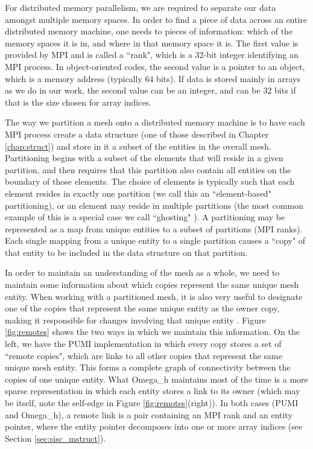 For distributed memory parallelism, we are required to separate our
data amongst multiple memory spaces.
In order to find a piece of data across an entire distributed memory
machine, one needs to pieces of information: which of the
memory spaces it is in, and where in that memory space it is.
The first value is provided by MPI and is called a ``rank", which is
a 32-bit integer identifying an MPI process.
In object-oriented codes, the second value is a pointer
to an object, which is a memory address (typically 64 bits).
If data is stored mainly in arrays as we do in our work,
the second value can be an integer, and can be 32 bits if
that is the size chosen for array indices.

The way we partition a mesh onto a distributed memory machine is
to have each MPI process create a data structure (one of those
described in Chapter \ref{chap:struct}) and store in it a subset
of the entities in the overall mesh.
Partitioning begins with a subset of the elements that will
reside in a given partition, and then requires that this
partition also contain all entities on the boundary of those
elements.
The choice of elements is typically such that each element resides
in exactly one partition (we call this an ``element-based" partitioning),
or an element may reside in multiple partitions (the most common
example of this is a special case we call ``ghosting"
\cite{ibanez2016pumi,lawlor2006parallel}).
A partitioning may be represented as a map from unique entities
to a subset of partitions (MPI ranks).
Each single mapping from a unique entity to a single partition
causes a ``copy" of that entity to be included in the data structure
on that partition.

In order to maintain an understanding of the mesh as a whole,
we need to maintain some information about which copies represent
the same unique mesh entity.
When working with a partitioned mesh, it is also very useful to
designate one of the copies that represent the same unique entity
as the owner copy, making it responsible for changes involving
that unique entity
\cite{seol2005fmdb,seol2006efficient,ibanez2016pumi}.
Figure \ref{fig:remotes} shows the two ways in which we maintain
this information.
On the left, we have the PUMI implementation in which every copy
stores a set of ``remote copies", which are links to all other copies
that represent the same unique mesh entity.
This forms a complete graph of connectivity between the copies of
one unique entity.
What Omega\_h maintains most of the time is a more sparse representation
in which each entity stores a link to its owner (which may
be itself, note the self-edge in Figure \ref{fig:remotes}(right)).
In both cases (PUMI and Omega\_h), a remote link is a pair
containing an MPI rank and an entity pointer, where the
entity pointer decomposes into one or more array indices
(see Section \ref{sec:sisc_mstruct}).

